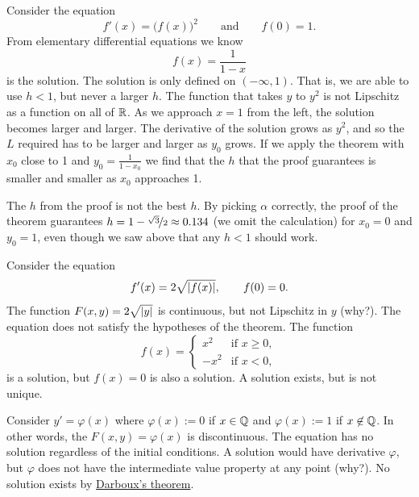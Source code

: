 \begin{example}
Consider the equation
\begin{equation*}
f'(x) = {\bigl(f(x)\bigr)}^2 \qquad \text{and} \qquad f(0)=1.
\end{equation*}
From elementary differential equations we know 
\begin{equation*}
f(x) = \frac{1}{1-x}
\end{equation*}
is the solution.
The solution is only defined on $(-\infty,1)$.  That is,
we are able to use $h < 1$, but never a larger $h$.
The function that takes $y$ to $y^2$ is
not Lipschitz as a function on all of ${\mathbb{R}}$.
As we approach $x=1$ from the left, the solution becomes larger
and larger.  The derivative of the solution grows as $y^2$, and so
the $L$ required has to be larger and larger as $y_0$ grows.
If we apply the
theorem with $x_0$ close to 1 and $y_0 = \frac{1}{1-x_0}$ we find
that the $h$ that the proof guarantees is smaller and smaller as $x_0$
approaches 1.

The $h$ from the proof is not the best $h$.
By picking $\alpha$ correctly, the proof of the theorem guarantees
$h=1-\nicefrac{\sqrt{3}}{2} \approx 0.134$ (we omit the
calculation) for $x_0=0$ and $y_0=1$, even though
we saw above that any $h < 1$ should work.
\end{example}

\begin{example}
Consider the equation
\begin{equation*}
f'(x) = 2 \sqrt{\left\lvert {f(x)} \right\rvert}, \qquad f(0) = 0 .
\end{equation*}
The function $F(x,y) = 2 \sqrt{\left\lvert {y} \right\rvert}$ is continuous,
but not Lipschitz in $y$ (why?). 
The equation does not satisfy the hypotheses of the theorem.
The function
\begin{equation*}
f(x) =
\begin{cases}
x^2 & \text{if } x \geq 0,\\
-x^2 & \text{if } x < 0,
\end{cases}
\end{equation*}
is a solution, but $f(x) = 0$ is also a solution.
A solution exists, but is not unique.
\end{example}

\begin{example}
Consider $y' = \varphi(x)$ where $\varphi(x) := 0$ if $x \in {\mathbb{Q}}$ and
$\varphi(x):=1$ if $x
\not\in {\mathbb{Q}}$.  In other words, the $F(x,y) = \varphi(x)$ is discontinuous.
The equation has no solution regardless of the initial
conditions.
A solution would have
derivative $\varphi$, but $\varphi$ does not have the intermediate value property
at any point (why?).  No solution exists by
\hyperref[thm:darboux]{Darboux's theorem}.
\end{example}

